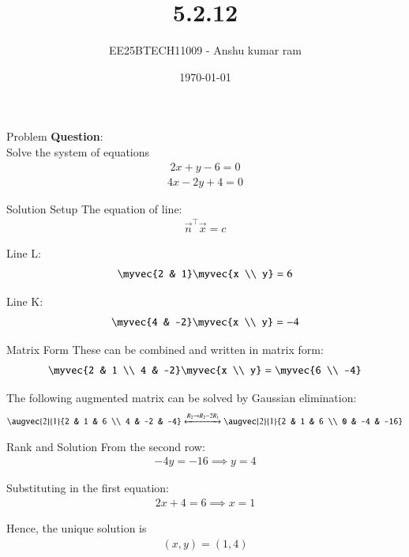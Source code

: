 \documentclass{beamer}
\title{5.2.12}
\date{\today}
\author{EE25BTECH11009 - Anshu kumar ram}
\begin{document}
\frame{\titlepage}

\begin{frame}{Problem}
\textbf{Question}:\\
Solve the system of equations
\begin{align}
2x+y-6=0
\end{align}
\begin{align}
4x-2y+4=0
\end{align}
\end{frame}

\begin{frame}{Solution Setup}
The equation of line:
\begin{align}
\vec{n}^\top\vec{x}=c
\end{align}

Line L:
\begin{align}
\myvec{2 & 1}\myvec{x \\ y}=6
\end{align}

Line K:
\begin{align}
\myvec{4 & -2}\myvec{x \\ y}=-4
\end{align}
\end{frame}

\begin{frame}{Matrix Form}
These can be combined and written in matrix form:
\begin{align}
\myvec{2 & 1 \\ 4 & -2}\myvec{x \\ y} = \myvec{6 \\ -4}
\end{align}

The following augmented matrix can be solved by Gaussian elimination:
\begin{align}
\augvec{2}{1}{2 & 1 & 6 \\ 4 & -2 & -4} \xleftrightarrow{R_2 \rightarrow R_2-2R_1} \augvec{2}{1}{2 & 1 & 6 \\ 0 & -4 & -16}
\end{align}
\end{frame}

\begin{frame}{Rank and Solution}
From the second row:
\begin{align}
-4y=-16 \implies y=4
\end{align}

Substituting in the first equation:
\begin{align}
2x+4=6 \implies x=1
\end{align}

Hence, the unique solution is
\begin{align}
(x,y)=(1,4)
\end{align}
\end{frame}
\end{document}
